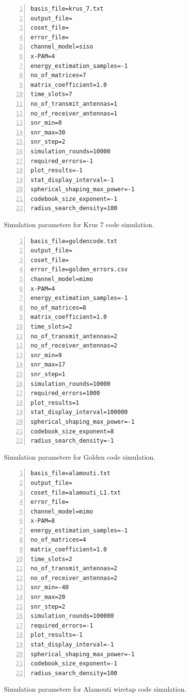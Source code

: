 \documentclass[english,12pt,a4paper,pdftex,sci,utf8]{aaltothesis}
\begin{document}
\begin{figure}[htb]
\begin{Verbatim}[frame=single, numbers=left]
basis_file=krus_7.txt           
output_file=                    
coset_file=                     
error_file=                     
channel_model=siso              
x-PAM=4                         
energy_estimation_samples=-1    
no_of_matrices=7                
matrix_coefficient=1.0          
time_slots=7                    
no_of_transmit_antennas=1       
no_of_receiver_antennas=1       
snr_min=0                       
snr_max=30                      
snr_step=2                      
simulation_rounds=10000         
required_errors=-1              
plot_results=-1                 
stat_display_interval=-1        
spherical_shaping_max_power=-1  
codebook_size_exponent=-1       
radius_search_density=100
\end{Verbatim}
\caption{Simulation parameters for Krus 7 code simulation.}
\label{fig:krus7_settings}
\end{figure}

\begin{figure}[htb]
\begin{Verbatim}[frame=single, numbers=left]
basis_file=goldencode.txt       
output_file=                    
coset_file=                     
error_file=golden_errors.csv    
channel_model=mimo              
x-PAM=4                         
energy_estimation_samples=-1    
no_of_matrices=8                
matrix_coefficient=1.0          
time_slots=2		        
no_of_transmit_antennas=2       
no_of_receiver_antennas=2       
snr_min=9                       
snr_max=17                      
snr_step=1		        
simulation_rounds=10000         
required_errors=1000            
plot_results=1                  
stat_display_interval=100000    
spherical_shaping_max_power=-1  
codebook_size_exponent=8        
radius_search_density=-1        
\end{Verbatim}
\caption{Simulation parameters for Golden code simulation.}
\label{fig:golden_settings}
\end{figure}

\begin{figure}[htb]
\begin{Verbatim}[frame=single, numbers=left]
basis_file=alamouti.txt         
output_file=                    
coset_file=alamouti_L1.txt      
error_file=                     
channel_model=mimo              
x-PAM=8                         
energy_estimation_samples=-1    
no_of_matrices=4                
matrix_coefficient=1.0          
time_slots=2                    
no_of_transmit_antennas=2       
no_of_receiver_antennas=2       
snr_min=-40                     
snr_max=20                      
snr_step=2                      
simulation_rounds=100000        
required_errors=-1              
plot_results=-1                 
stat_display_interval=-1        
spherical_shaping_max_power=-1  
codebook_size_exponent=-1       
radius_search_density=100       
\end{Verbatim}
\caption{Simulation parameters for Alamouti wiretap code simulation.}
\label{fig:wiretap_settings}
\end{figure}
\end{document}
